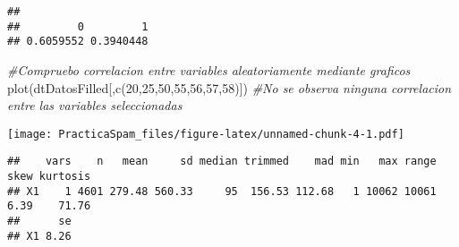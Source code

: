 \documentclass[
]{article}
\newenvironment{Shaded}{\begin{snugshade}}{\end{snugshade}}
\newcommand{\CommentTok}[1]{\textcolor[rgb]{0.56,0.35,0.01}{\textit{#1}}}
\newcommand{\DecValTok}[1]{\textcolor[rgb]{0.00,0.00,0.81}{#1}}
\newcommand{\FunctionTok}[1]{\textcolor[rgb]{0.00,0.00,0.00}{#1}}
\newcommand{\NormalTok}[1]{#1}
\newcommand{\OtherTok}[1]{\textcolor[rgb]{0.56,0.35,0.01}{#1}}
\newcommand{\SpecialCharTok}[1]{\textcolor[rgb]{0.00,0.00,0.00}{#1}}
\begin{document}
\begin{Shaded}
\end{Shaded}

\begin{verbatim}
## 
##         0         1 
## 0.6059552 0.3940448
\end{verbatim}

\begin{Shaded}
\begin{Highlighting}[]
  \CommentTok{\#Compruebo correlacion entre variables aleatoriamente mediante graficos}
  \FunctionTok{plot}\NormalTok{(dtDatosFilled[,}\FunctionTok{c}\NormalTok{(}\DecValTok{20}\NormalTok{,}\DecValTok{25}\NormalTok{,}\DecValTok{50}\NormalTok{,}\DecValTok{55}\NormalTok{,}\DecValTok{56}\NormalTok{,}\DecValTok{57}\NormalTok{,}\DecValTok{58}\NormalTok{)]) }\CommentTok{\#No se observa ninguna correlacion entre las variables seleccionadas}
\end{Highlighting}
\end{Shaded}

\texttt{[image: PracticaSpam\_files/figure-latex/unnamed-chunk-4-1.pdf]}

\begin{Shaded}
\end{Shaded}

\begin{verbatim}
##    vars    n   mean     sd median trimmed    mad min   max range skew kurtosis
## X1    1 4601 279.48 560.33     95  156.53 112.68   1 10062 10061 6.39    71.76
##      se
## X1 8.26
\end{verbatim}

\begin{Shaded}
\end{Shaded}
\end{document}
